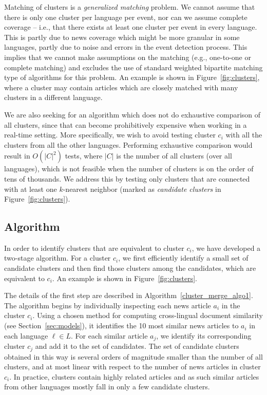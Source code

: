 \documentclass[twoside,11pt]{article}
\begin{document}
Matching of clusters is a \emph{generalized matching} problem. We cannot assume that there is only one cluster per language per event, nor can we assume complete coverage -- i.e., that there exists at least one cluster per event in every language. This is partly due to news coverage which might be more granular in some languages, partly due to noise and errors in the event detection process. This implies that we cannot make assumptions on the matching (e.g., one-to-one or complete matching) and excludes the use of standard weighted bipartite matching type of algorithms for this problem. An example is shown in Figure~\ref{fig:clusters}, where a cluster may contain articles which are closely matched with many clusters in a different language.

We are also seeking for an algorithm which does not do exhaustive comparison of all clusters, since that can become prohibitively expensive when working in a real-time setting. More specifically, we wish to avoid testing cluster $c_i$ with all the clusters from all the other languages. Performing exhaustive comparison would result in $O(|C|^2)$ tests, where $|C|$ is the number of all clusters (over all languages), which is not feasible when the number of clusters is on the order of tens of thousands. We address this by testing only clusters that are connected with at least one $k$-nearest neighbor (marked as \emph{candidate clusters} in Figure~\ref{fig:clusters}).

\subsection{Algorithm}\label{algo:features}

In order to identify clusters that are equivalent to cluster $c_i$, we have developed a two-stage algorithm. For a cluster $c_i$, we first efficiently identify a small set of candidate clusters and then find those clusters among the candidates, which are equivalent to $c_i$. An example is  shown in  Figure~\ref{fig:clusters}.

The details of the first step are described in Algorithm~\ref{cluster_merge_algo1}. The algorithm begins by individually inspecting each news article $a_i$ in the cluster $c_i$. Using a chosen method for computing cross-lingual document similarity (see Section~\ref{sec:models}), it identifies the 10 most similar news articles to $a_i$ in each language $\ell \in L$. For each similar article $a_j$, we identify its corresponding  cluster $c_j$ and add it to the set of candidates. The set of candidate clusters obtained in this way is several orders of magnitude smaller than the number of all clusters, and at most linear with respect to the number of news articles in cluster $c_i$. In practice, clusters contain highly related articles and as such similar articles from other languages mostly fall in only a few candidate clusters.
\end{document}
